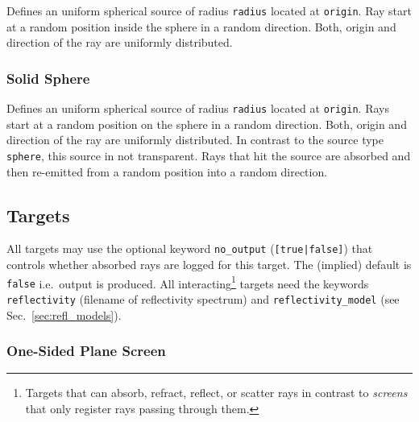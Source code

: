 \documentclass[10pt,a4paper,titlepage]{article}
\begin{document}



\vspace{0.25cm}
Defines an uniform spherical source of radius {\tt radius} located at {\tt origin}. Ray start at a random position inside the sphere in a random direction. Both, origin and direction of the ray are uniformly distributed.

\subsubsection{Solid Sphere}








\vspace{0.25cm}
Defines an uniform spherical source of radius {\tt radius} located at {\tt origin}. Rays start at a random position on the sphere in a random direction. Both, origin and direction of the ray are uniformly distributed. In contrast to the source type {\tt sphere}, this source in not transparent. Rays that hit the source are absorbed and then re-emitted from a random position into a random direction.




\subsection{Targets}
All targets may use the optional keyword {\tt no\_output} ({\tt [true|false]}) that controls whether absorbed rays are logged for this target. The (implied) default is {\tt false} i.e.\ output is produced. All interacting\footnote{Targets that can absorb, refract, reflect, or scatter rays in contrast to {\it screens} that only register rays passing through them.} targets need the keywords {\tt reflectivity} (filename of reflectivity spectrum) and {\tt reflectivity\_model} (see Sec.~\ref{sec:refl_models}).

\subsubsection{One-Sided Plane Screen}
\end{document}
